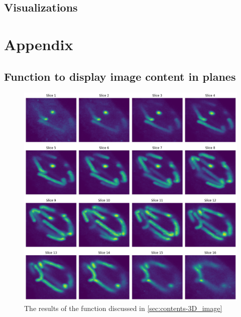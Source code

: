 \documentclass{article}
\begin{document}
\subsection*{Visualizations}
\clearpage
\section*{Appendix}
\subsection*{Function to display image content in planes}
\begin{figure}[h!]
    \centering
    \includegraphics[width=1\linewidth]{Report/Images/3d_plot.png}
    \caption{The results of the function discussed in \ref{sec:contents-3D_image}}
    \label{fig:3d-plane-image}
\end{figure}
% 
% 
\end{document}
